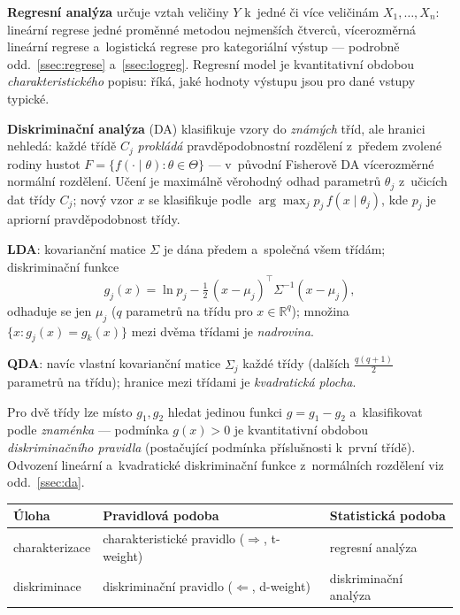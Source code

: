 \documentclass[11pt,a4paper]{article}
\theoremstyle{definition}
\begin{document}
\textbf{Regresní analýza} určuje vztah veličiny $Y$ k~jedné či více veličinám
$X_1,\dots,X_n$: lineární regrese jedné proměnné metodou nejmenších čtverců,
vícerozměrná lineární regrese a~logistická regrese pro kategoriální výstup --- podrobně
odd.~\ref{ssec:regrese} a~\ref{ssec:logreg}. Regresní model je kvantitativní obdobou
\emph{charakteristického} popisu: říká, jaké hodnoty výstupu jsou pro dané vstupy
typické.

\textbf{Diskriminační analýza} (DA) klasifikuje vzory do \emph{známých} tříd, ale hranici
nehledá: každé třídě $C_j$ \emph{prokládá} pravděpodobnostní rozdělení z~předem zvolené
rodiny hustot $F=\{f(\cdot\mid\theta):\theta\in\Theta\}$ --- v~původní Fisherově DA
vícerozměrné normální rozdělení. Učení je maximálně věrohodný odhad parametrů $\theta_j$
z~učicích dat třídy $C_j$; nový vzor $x$ se klasifikuje podle
$\arg\max_j p_j\,f(x\mid\theta_j)$, kde $p_j$ je apriorní pravděpodobnost třídy.

\begin{defbox}
\textbf{LDA}: kovarianční matice $\Sigma$ je dána předem a~společná všem třídám;
diskriminační funkce
\[ g_j(x)=\ln p_j-\tfrac12\,(x-\mu_j)^{\!\top}\Sigma^{-1}(x-\mu_j), \]
odhaduje se jen $\mu_j$ ($q$ parametrů na třídu pro $x\in\mathbb{R}^q$); množina
$\{x: g_j(x)=g_k(x)\}$ mezi dvěma třídami je \emph{nadrovina}.

\textbf{QDA}: navíc vlastní kovarianční matice $\Sigma_j$ každé třídy (dalších
$\tfrac{q(q+1)}{2}$ parametrů na třídu); hranice mezi třídami je \emph{kvadratická
plocha}.
\end{defbox}

Pro dvě třídy lze místo $g_1,g_2$ hledat jedinou funkci $g=g_1-g_2$ a~klasifikovat podle
\emph{znaménka} --- podmínka $g(x)>0$ je kvantitativní obdobou \emph{diskriminačního
pravidla} (postačující podmínka příslušnosti k~první třídě). Odvození lineární
a~kvadratické diskriminační funkce z~normálních rozdělení viz odd.~\ref{ssec:da}.

\begin{center}
\small
\begin{tabular}{@{}lll@{}}
\toprule
\textbf{Úloha} & \textbf{Pravidlová podoba} & \textbf{Statistická podoba} \\
\midrule
charakterizace & charakteristické pravidlo ($\Rightarrow$, t-weight) & regresní analýza \\
diskriminace & diskriminační pravidlo ($\Leftarrow$, d-weight) & diskriminační analýza \\
\bottomrule
\end{tabular}
\end{center}
\end{document}

